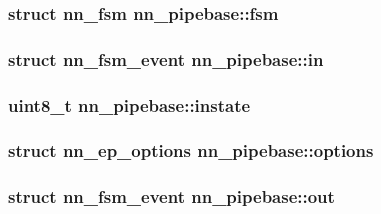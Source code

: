 \subsubsection[{fsm}]{\setlength{\rightskip}{0pt plus 5cm}struct {\bf nn\+\_\+fsm} nn\+\_\+pipebase\+::fsm}\hypertarget{structnn__pipebase_a2df83f45bfd06e19ef9519e95e8c459d}{}\label{structnn__pipebase_a2df83f45bfd06e19ef9519e95e8c459d}
\subsubsection[{in}]{\setlength{\rightskip}{0pt plus 5cm}struct {\bf nn\+\_\+fsm\+\_\+event} nn\+\_\+pipebase\+::in}\hypertarget{structnn__pipebase_ad1ca938a85f997895828e920920ab6c6}{}\label{structnn__pipebase_ad1ca938a85f997895828e920920ab6c6}
\subsubsection[{instate}]{\setlength{\rightskip}{0pt plus 5cm}uint8\+\_\+t nn\+\_\+pipebase\+::instate}\hypertarget{structnn__pipebase_a52c7c1a0428f1cd9b89f30217442ec36}{}\label{structnn__pipebase_a52c7c1a0428f1cd9b89f30217442ec36}
\subsubsection[{options}]{\setlength{\rightskip}{0pt plus 5cm}struct {\bf nn\+\_\+ep\+\_\+options} nn\+\_\+pipebase\+::options}\hypertarget{structnn__pipebase_a3da55d5d4fd95032107b0e66286cf62b}{}\label{structnn__pipebase_a3da55d5d4fd95032107b0e66286cf62b}
\subsubsection[{out}]{\setlength{\rightskip}{0pt plus 5cm}struct {\bf nn\+\_\+fsm\+\_\+event} nn\+\_\+pipebase\+::out}\hypertarget{structnn__pipebase_a1c450f3f6188b25f28ce8639dece4c90}{}\label{structnn__pipebase_a1c450f3f6188b25f28ce8639dece4c90}
